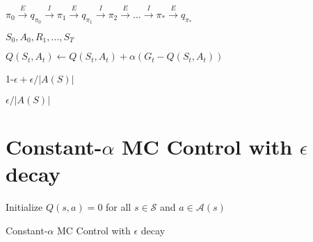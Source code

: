 \documentclass[10pt]{amsart}
\begin{document}
\vspace{.5in}

 
 $\pi_{0} \xrightarrow{E} q_{\pi_{0}}  \xrightarrow{I} \pi_{1} \xrightarrow{E} q_{\pi_{1}}  \xrightarrow{I} \pi_{2} \xrightarrow{E} . . . \xrightarrow{I}  \pi_{*} \xrightarrow{E} q_{\pi_{*}} $

\vspace{.5in}


$S_0, A_0, R_1, \ldots, S_T$

\vspace{.5in}

$Q(S_t, A_t) \leftarrow Q(S_t, A_t) + \alpha(G_t - Q(S_t, A_t))$

\vspace{.5in}

1-$\epsilon + \epsilon/|A(S)|$

\vspace{.5in}

$\epsilon/|A(S)|$

\newpage

\section*{Constant-$\alpha$ MC Control with $\epsilon$ decay}



\begin{algorithm}

	Initialize $Q(s,a) = 0$ for all $s\in\mathcal{S}$ and $a\in\mathcal{A}(s)$ \\
	\KwRet{$\pi$}
	\caption{Constant-$\alpha$ MC Control with $\epsilon$ decay}
\end{algorithm}




\vspace{.5in}
\end{document}

